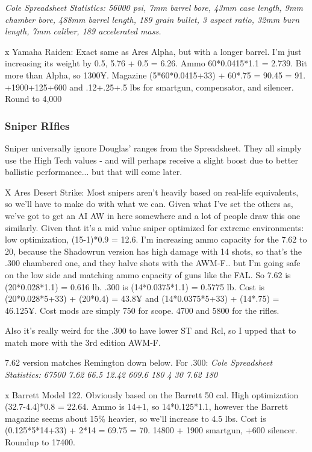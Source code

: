 \begin{multicols*}{2}
	\textit{\textcolor{OliveGreen}{Cole Spreadsheet Statistics:  56000 psi, 7mm barrel bore, 43mm case length, 9mm chamber bore, 488mm barrel length, 189 grain bullet, 3 aspect ratio, 32mm burn length, 7mm caliber, 189 accelerated mass.}}
	
	x Yamaha Raiden: Exact same as Ares Alpha, but with a longer barrel. I'm just increasing its weight by 0.5, 5.76 + 0.5 = 6.26. Ammo 60*0.0415*1.1 = 2.739. Bit more than Alpha, so 1300¥. Magazine (5*60*0.0415+33) + 60*.75 = 90.45 = 91. +1900+125+600 and .12+.25+.5 lbs for smartgun, compensator, and silencer. Round to 4,000
	
	\subsubsection{Sniper RIfles}
	
	Sniper universally ignore Douglas' ranges from the Spreadsheet. They all simply use the High Tech values - and will perhaps receive a slight boost due to better ballistic performance... but that will come later.
	
	X Ares Desert Strike: Most snipers aren't heavily based on real-life equivalents, so we'll have to make do with what we can. Given what I've set the others as, we've got to get an AI AW in here somewhere and a lot of people draw this one similarly. Given that it's a mid value sniper optimized for extreme environments: low optimization, (15-1)*0.9 = 12.6. I'm increasing ammo capacity for the 7.62 to 20, because the Shadowrun version has high damage with 14 shots, so that's the .300 chambered one, and they halve shots with the AWM-F.. but I'm going safe on the low side and matching ammo capacity of guns like the FAL. So 7.62 is (20*0.028*1.1) = 0.616 lb. .300 is (14*0.0375*1.1) = 0.5775 lb. Cost is (20*0.028*5+33) + (20*0.4) = 43.8¥ and (14*0.0375*5+33) + (14*.75) = 46.125¥. Cost mods are simply 750 for scope. 4700 and 5800 for the rifles.
	
	Also it's really weird for the .300 to have lower ST and Rcl, so I upped that to match more with the 3rd edition AWM-F.
	
	7.62 version matches Remington down below.
	For .300:
	\textit{\textcolor{OliveGreen}{Cole Spreadsheet Statistics: 67500 7.62 66.5 12.42 609.6 180 4 30 7.62 180}}
	
	x Barrett Model 122. Obviously based on the Barrett 50 cal. High optimization (32.7-4.4)*0.8 = 22.64. Ammo is  14+1, so  14*0.125*1.1, however the Barrett magazine seems about 15\% heavier, so we'll increase to 4.5 lbs. Cost is (0.125*5*14+33) + 2*14 = 69.75 = 70. 14800 + 1900 smartgun, +600 silencer. Roundup to 17400.
	

\end{multicols*}
